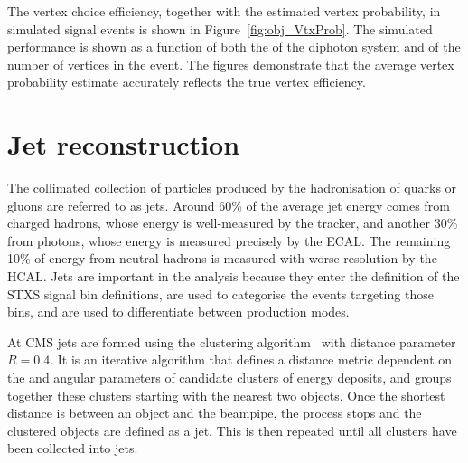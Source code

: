 The vertex choice efficiency, together with the estimated vertex probability,
in simulated \Hgg signal events is shown in Figure~\ref{fig:obj_VtxProb}.
The simulated performance is shown as a function of both the \pt of the diphoton
system and of the number of vertices in the event.
The figures demonstrate that the average vertex probability estimate 
accurately reflects the true vertex efficiency.

\section{Jet reconstruction}

The collimated collection of particles produced by the hadronisation of quarks or gluons are referred to as jets.
Around 60\% of the average jet energy comes from charged hadrons, whose energy is well-measured by the tracker,
and another 30\% from photons, whose energy is measured precisely by the ECAL.
The remaining 10\% of energy from neutral hadrons is measured with worse resolution by the HCAL.
Jets are important in the \Hgg analysis because they enter the definition of the STXS signal bin definitions, 
are used to categorise the events targeting those bins, 
and are used to differentiate between production modes.

At CMS jets are formed using the \akt clustering algorithm~\cite{AntiKt} with distance parameter $R=0.4$. %
It is an iterative algorithm that defines a distance metric dependent on the \pt and angular parameters of candidate clusters of energy deposits, 
and groups together these clusters starting with the nearest two objects.
Once the shortest distance is between an object and the beampipe, the process stops and the clustered objects are defined as a jet.
This is then repeated until all clusters have been collected into jets.

